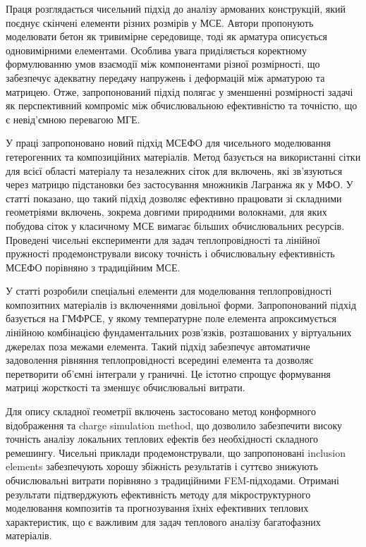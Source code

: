 Праця \cite{benoit-2017-article-review} розглядається чисельний підхід до аналізу армованих конструкцій, який поєднує
скінчені елементи різних розмірів у МСЕ. Автори пропонують моделювати бетон як тривимірне середовище, тоді як арматура
описується одновимірними елементами. Особлива увага приділяється коректному формулюванню умов взаємодії між компонентами
різної розмірності, що забезпечує адекватну передачу напружень і деформацій між арматурою та матрицею. Отже,
запропонований підхід полягає у зменшенні розмірності задачі як перспективний компроміс між обчислювальною ефективністю
та точністю, що є невід'ємною перевагою МГЕ.

У праці \cite{he-2025-article-review} запропоновано новий підхід МСЕФО для чисельного моделювання гетерогенних та
композиційних матеріалів. Метод базується на використанні сітки для всієї області матеріалу та незалежних сіток для
включень, які зв'язуються через матрицю підстановки без застосування множників Лагранжа як у МФО. У статті показано, що
такий підхід дозволяє ефективно працювати зі складними геометріями включень, зокрема довгими природними волокнами, для
яких побудова сіток у класичному МСЕ вимагає більших обчислювальних ресурсів. Проведені чисельні експерименти для задач
теплопровідності та лінійної пружності продемонстрували високу точність і обчислювальну ефективність МСЕФО порівняно з
традиційним МСЕ.

У статті \cite{wang-2024-article-review} розробили спеціальні  елементи для моделювання теплопровідності композитних 
матеріалів із включеннями довільної форми. Запропонований підхід базується на ГМФРСЕ, у якому температурне поле
елемента апроксимується лінійною комбінацією фундаментальних розв'язків, розташованих у віртуальних джерелах поза межами
елемента. Такий підхід забезпечує автоматичне задоволення рівняння теплопровідності всередині елемента та дозволяє перетворити
об’ємні інтеграли у граничні. Це істотно спрощує формування матриці жорсткості та зменшує обчислювальні витрати.

Для опису складної геометрії
включень застосовано метод конформного відображення та charge simulation method, що дозволило забезпечити високу
точність аналізу локальних теплових ефектів без необхідності складного ремешингу. Чисельні приклади продемонстрували, що
запропоновані inclusion elements забезпечують хорошу збіжність результатів і суттєво знижують обчислювальні витрати
порівняно з традиційними FEM-підходами. Отримані результати підтверджують ефективність методу для мікроструктурного
моделювання композитів та прогнозування їхніх ефективних теплових характеристик, що є важливим для задач теплового
аналізу багатофазних матеріалів.




